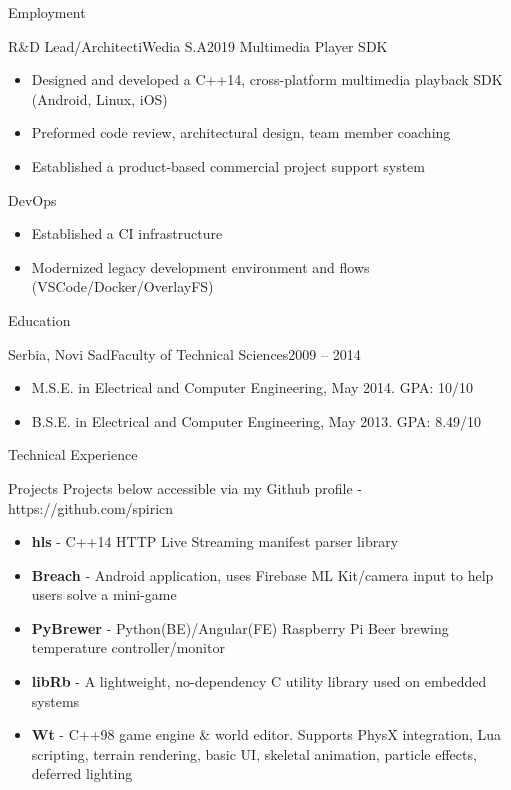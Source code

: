 \documentclass[]{mcdowellcv}
\begin{document}
\begin{cvsection}{Employment}
		\begin{cvsubsection}{R\&D Lead/Architect}{iWedia S.A}{2019}
			Multimedia Player SDK
			\begin{itemize}
				\item Designed and developed a C++14, cross-platform multimedia playback SDK (Android, Linux, iOS)
				\item Preformed code review, architectural design, team member coaching
				\item Established a product-based commercial project support system
			\end{itemize}
			DevOps
			\begin{itemize}
				\item Established a CI infrastructure
				\item Modernized legacy development environment and flows (VSCode/Docker/OverlayFS)
			\end{itemize}
		\end{cvsubsection}
	\end{cvsection}

	\begin{cvsection}{Education}
		\begin{cvsubsection}{Serbia, Novi Sad}{Faculty of Technical Sciences}{2009 -- 2014}
			\begin{itemize}
				\item M.S.E. in Electrical and Computer Engineering, May 2014. GPA: 10/10
				\item B.S.E. in Electrical and Computer Engineering, May 2013. GPA: 8.49/10
			\end{itemize}
		\end{cvsubsection}
	\end{cvsection}

	\begin{cvsection}{Technical Experience}
		\begin{cvsubsection}{Projects}{}{}
			Projects below accessible via my Github profile - https://github.com/spiricn
			\begin{itemize}
				\item \textbf{hls} - C++14 HTTP Live Streaming manifest parser library
				\item \textbf{Breach} - Android application, uses Firebase ML Kit/camera input to help users solve a mini-game
				\item \textbf{PyBrewer} - Python(BE)/Angular(FE) Raspberry Pi Beer brewing temperature controller/monitor
				\item \textbf{libRb} - A lightweight, no-dependency C utility library used on embedded systems
				\item \textbf{Wt} - C++98 game engine \& world editor. Supports PhysX integration, Lua scripting, terrain rendering, basic UI, skeletal animation, particle effects, deferred lighting
			\end{itemize}
		\end{cvsubsection}
	\end{cvsection}
\end{document}
